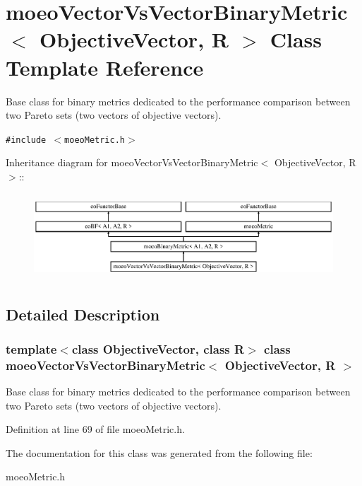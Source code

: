 \section{moeo\-Vector\-Vs\-Vector\-Binary\-Metric$<$ Objective\-Vector, R $>$ Class Template Reference}
\label{classmoeoVectorVsVectorBinaryMetric}
Base class for binary metrics dedicated to the performance comparison between two Pareto sets (two vectors of objective vectors).  


{\tt \#include $<$moeo\-Metric.h$>$}

Inheritance diagram for moeo\-Vector\-Vs\-Vector\-Binary\-Metric$<$ Objective\-Vector, R $>$::\begin{figure}[H]
\begin{center}
\leavevmode
\includegraphics[height=3.22767cm]{classmoeoVectorVsVectorBinaryMetric}
\end{center}
\end{figure}


\subsection{Detailed Description}
\subsubsection*{template$<$class Objective\-Vector, class R$>$ class moeo\-Vector\-Vs\-Vector\-Binary\-Metric$<$ Objective\-Vector, R $>$}

Base class for binary metrics dedicated to the performance comparison between two Pareto sets (two vectors of objective vectors). 



Definition at line 69 of file moeo\-Metric.h.

The documentation for this class was generated from the following file:\begin{CompactItemize}
\item 
moeo\-Metric.h\end{CompactItemize}
